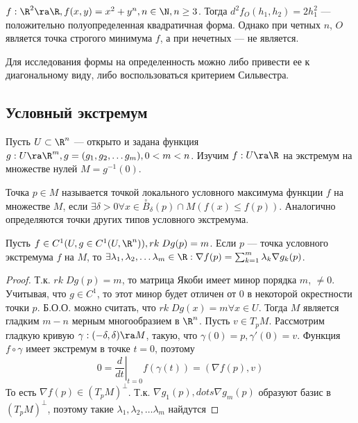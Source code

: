 \begin{example}
    \(f: \R^2 \ra \R, f(x, y) = x^2 + y^n, n \in \N, n \ge 3\). Тогда \(d^2f_O(h_1, h_2) = 2h_1^2\) --- положительно полуопределенная квадратичная форма. Однако при четных \(n\), \(O\) является точка строгого минимума \(f\), а при нечетных --- не является.
\end{example}

\begin{note}
    Для исследования формы на определенность можно либо привести ее к диагональному виду, либо воспользоваться критерием Сильвестра.
\end{note}

\subsection{Условный экстремум}
Пусть \(U \subset \R^n\) --- открыто и задана функция \(g: U \ra \R^m, g = (g_1, g_2, \dots g_m), 0 < m < n\). Изучим \(f: U \ra \R\) на экстремум на множестве нулей \(M = g^{-1}(0)\).
\begin{definition}
    Точка \(p \in M\) называется точкой локального условного максимума функции \(f\) на множестве \(M\), если \(\exists \delta > 0 \forall x \in \stackrel{\circ}{B}_\delta(p) \cap M (f(x) \le f(p))\). Аналогично определяются точки других типов условного экстремума.
\end{definition}

\begin{theorem}[Лагранж]
    Пусть \(f \in C^1(U, g \in C^1(U, \R^n)), rk\;Dg(p) = m\). Если \(p\) --- точка условного экстремума \(f\) на \(M\), то \(\exists \lambda_1, \lambda_2, \dots \lambda_m \in \R: \nabla f(p) = \sum_{k = 1}^m \lambda_k \nabla g_k(p)\).
\end{theorem}
\begin{proof}
    Т.к. \(rk\;Dg(p) = m\), то матрица Якоби имеет минор порядка \(m\), \(\ne 0\). Учитывая, что \(g \in C^1\), то этот минор будет отличен от \(0\) в некоторой окрестности точки \(p\). Б.О.О. можно считать, что \(rk\;Dg(x) = m \forall x \in U\). Тогда \(M\) является гладким \(m - n\) мерным многообразием в \(\R^n\). Пусть \(v \in T_pM\). Рассмотрим гладкую кривую \(\gamma: (-\delta, \delta) \ra M\), такую, что \(\gamma(0) = p, \gamma'(0) = v\). Функция \(f \circ \gamma\) имеет экстремум в точке \(t = 0\), поэтому
    \[0 = \left.\frac{d}{dt}\right|_{t = 0}f(\gamma(t)) = (\nabla f(p), v)\]
    То есть \(\nabla f(p) \in (T_pM)^{\perp}\). Т.к. \(\nabla g_1(p), dots \nabla g_m(p)\) образуют базис в \((T_pM)^{\perp}\), поэтому такие \(\lambda_1, \lambda_2, \dots \lambda_m\) найдутся
\end{proof}
